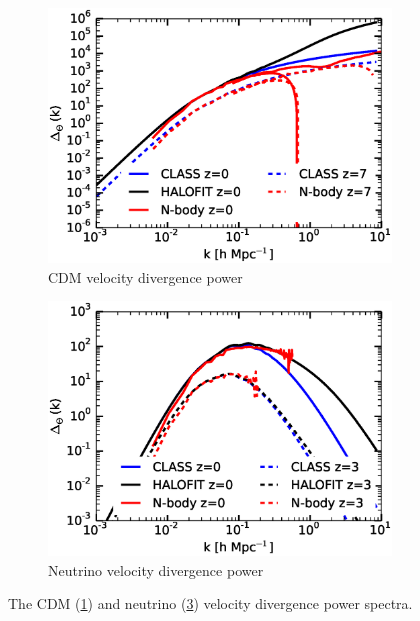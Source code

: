 \documentclass{aastex}
\begin{document}
\begin{figure}[h!]
  \centering
  \begin{subfigure}[t]{0.495\textwidth}
    \includegraphics[width=\textwidth]{Figures/vel_cdm.eps}
    \caption{CDM velocity divergence power}\label{fig:velcdm}
  \end{subfigure}
  \begin{subfigure}[t]{0.495\textwidth}
    \centering
    \includegraphics[width=\textwidth]{Figures/vel_nu.eps}
    \caption{Neutrino velocity divergence power}\label{fig:velnu}
  \end{subfigure}
  \caption{The CDM
    (\ref{fig:velcdm}) and neutrino (\ref{fig:velnu}) velocity
      divergence power
      spectra.
}
\end{figure}
\end{document}
